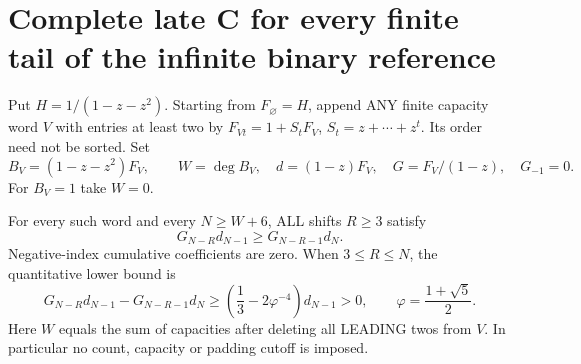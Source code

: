 \section{Complete late C for every finite tail of the infinite binary reference}
Put $H=1/(1-z-z^2)$. Starting from $F_\varnothing=H$, append ANY
finite capacity word $V$ with entries at least two by
$F_{Vt}=1+S_tF_V$, $S_t=z+\cdots+z^t$.
Its order need not be sorted. Set
\[
 B_V=(1-z-z^2)F_V,\qquad W=\deg B_V,\quad
 d=(1-z)F_V,\quad G=F_V/(1-z),\quad G_{-1}=0.
\]
For $B_V=1$ take $W=0$.

\begin{theorem}
For every such word and every $N\ge W+6$, ALL shifts $R\ge3$ satisfy
\[
                 G_{N-R}d_{N-1}\ge G_{N-R-1}d_N.           \tag{1}
\]
Negative-index cumulative coefficients are zero. When $3\le R\le N$,
the quantitative lower bound is
\[
 G_{N-R}d_{N-1}-G_{N-R-1}d_N
    \ge\left(\frac13-2\varphi^{-4}\right)d_{N-1}>0,
 \qquad \varphi=\frac{1+\sqrt5}{2}.                        \tag{2}
\]
Here $W$ equals the sum of capacities after deleting all LEADING twos
from $V$. In particular no count, capacity or padding cutoff is imposed.
\end{theorem}


